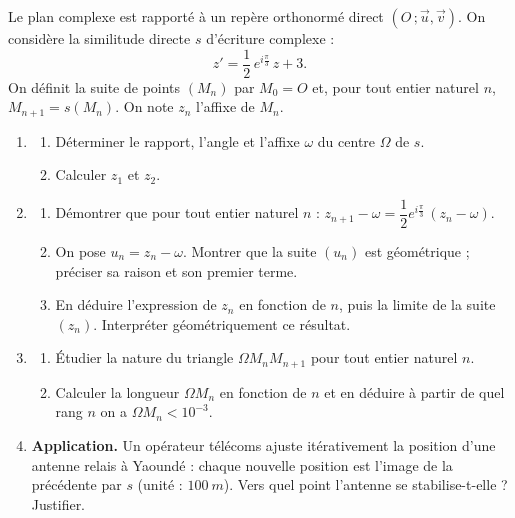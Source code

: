 \documentclass[11pt]{article}
\begin{document}
\begin{exercice}
Le plan complexe est rapporté à un repère orthonormé direct $(O\,;\vec{u},\vec{v})$. On considère la similitude directe $s$ d'écriture complexe :
\[ z' = \dfrac{1}{2}\,e^{i\frac{\pi}{3}}\,z + 3. \]
On définit la suite de points $(M_n)$ par $M_0 = O$ et, pour tout entier naturel $n$, $M_{n+1} = s(M_n)$. On note $z_n$ l'affixe de $M_n$.
\begin{enumerate}
\item \begin{enumerate}
\item Déterminer le rapport, l'angle et l'affixe $\omega$ du centre $\Omega$ de $s$.
\item Calculer $z_1$ et $z_2$.
\end{enumerate}
\item \begin{enumerate}
\item Démontrer que pour tout entier naturel $n$ : $z_{n+1} - \omega = \dfrac{1}{2}e^{i\frac{\pi}{3}}\,(z_n - \omega)$.
\item On pose $u_n = z_n - \omega$. Montrer que la suite $(u_n)$ est géométrique ; préciser sa raison et son premier terme.
\item En déduire l'expression de $z_n$ en fonction de $n$, puis la limite de la suite $(z_n)$. Interpréter géométriquement ce résultat.
\end{enumerate}
\item \begin{enumerate}
\item Étudier la nature du triangle $\Omega M_n M_{n+1}$ pour tout entier naturel $n$.
\item Calculer la longueur $\Omega M_n$ en fonction de $n$ et en déduire à partir de quel rang $n$ on a $\Omega M_n < 10^{-3}$.
\end{enumerate}
\item \textbf{Application.} Un opérateur télécoms ajuste itérativement la position d'une antenne relais à Yaoundé : chaque nouvelle position est l'image de la précédente par $s$ (unité : $\SI{100}{m}$). Vers quel point l'antenne se stabilise-t-elle ? Justifier.
\end{enumerate}
\end{exercice}
\end{document}
